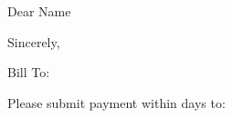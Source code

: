 \documentclass[fontsize=12pt,paper=a4]{scrlttr2}
\begin{document}
	\begin{letter}{%
			\customer
			}

		\opening{Dear Name}
		\invoiceLetter
		
		\closing{Sincerely,}
			\end{letter}

		\begin{letter}{%
				Bill To:\\
				\customer
				}
			
			\opening{\null}
			
			\invoice
			
			Please submit payment within \daystopay days to:\\\\
			\closing{\null}

		\end{letter}
		
		
\end{document}
